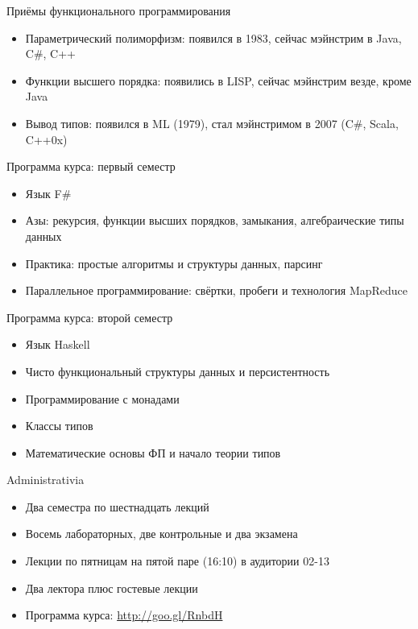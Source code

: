 \documentclass{beamer}
\begin{document}
\begin{frame}{Приёмы функционального программирования}
  \begin{itemize}
  \item Параметрический полиморфизм: появился в 1983, сейчас мэйнстрим в
    Java, C\#, C++\pause
  \item Функции высшего порядка: появились в LISP, сейчас мэйнстрим везде,
    кроме Java\pause
  \item Вывод типов: появился в ML (1979), стал мэйнстримом в 2007
    (C\#, Scala, C++0x)
  \end{itemize}
\end{frame}

\begin{frame}{Программа курса: первый семестр}
  \begin{itemize}
    \item Язык F\#\pause
    \item Азы: рекурсия, функции высших порядков, замыкания, алгебраические
      типы данных\pause
    \item Практика: простые алгоритмы и структуры данных, парсинг\pause
    \item Параллельное программирование: свёртки, пробеги и технология MapReduce
  \end{itemize}
\end{frame}

\begin{frame}{Программа курса: второй семестр}
  \begin{itemize}
    \item Язык Haskell\pause
    \item Чисто функциональный структуры данных и персистентность\pause
    \item Программирование с монадами\pause
    \item Классы типов\pause
    \item Математические основы ФП и начало теории типов
  \end{itemize}
\end{frame}

\begin{frame}{Administrativia}
  \begin{itemize}
  \item Два семестра по шестнадцать лекций
  \item Восемь лабораторных, две контрольные и два экзамена\pause
  \item Лекции по пятницам на пятой паре (16:10) в аудитории 02-13\pause
  \item Два лектора плюс гостевые лекции\pause
  \item Программа курса: \url{http://goo.gl/RnbdH}
  \end{itemize}
\end{frame}
\end{document}

